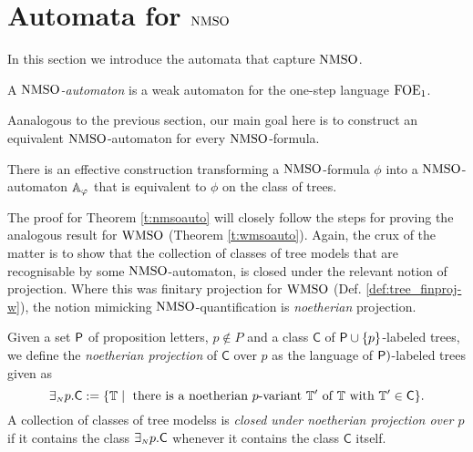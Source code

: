 
\section{Automata for $\mathrm{NMSO}$}
   \label{sec:autnmso}

In this section we introduce the automata that capture $\mathrm{NMSO}$.

\begin{definition}
A \emph{$\mathrm{NMSO}$-automaton} is a weak automaton for the one-step language $\mathrm{FOE}_1$.
\end{definition}

Aanalogous to the previous section, our main goal here is to construct an
equivalent $\mathrm{NMSO}$-automaton for every $\mathrm{NMSO}$-formula.

\begin{theorem}
\label{t:nmsoauto}
There is an effective construction transforming a $\mathrm{NMSO}$-formula $\phi$
into a $\mathrm{NMSO}$-automaton $\mathbb{A}_{\varphi}$ that is equivalent
to $\phi$ on the class of trees.
\end{theorem}

The proof for Theorem \ref{t:nmsoauto} will closely follow the steps for proving
the analogous result for $\mathrm{WMSO}$ (Theorem \ref{t:wmsoauto}).
Again, the crux of the matter is to show that the collection of classes of tree
models that are recognisable by some $\mathrm{NMSO}$-automaton, is closed under the 
relevant notion of projection.
Where this was finitary projection for $\mathrm{WMSO}$ (Def. \ref{def:tree_finproj-w}),
the notion mimicking $\mathrm{NMSO}$-quantification is \emph{noetherian} projection.

\begin{definition}\label{def:tree_finproj-n}
Given a set $\mathsf{P}$ of proposition letters, $p \not\in P$ and a class 
$\mathsf{C}$ of $\mathsf{P}\cup\{p\}$-labeled trees, we define the \emph{noetherian 
projection} of $\mathsf{C}$ over $p$ as the language of $\mathsf{P})$-labeled trees 
given as 
$$
\noetexists p.\mathsf{C} \df \{\bbT \mid 
   \text{ there is a noetherian $p$-variant } \bbT' \text{ of } \bbT 
   \text{ with } \bbT' \in \mathsf{C}\}.
$$
A collection of classes of tree modelss is \emph{closed under noetherian 
projection over $p$} if it contains the class ${{\exists_{{\scriptscriptstyle N}}} p}.\mathsf{C}$
whenever it contains the class $\mathsf{C}$ itself.
\end{definition}

